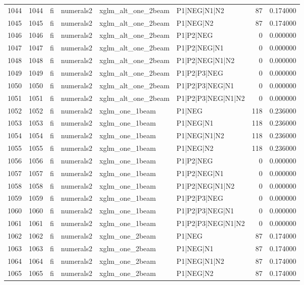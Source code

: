 \begin{tabular}{lrllllrr}
1044 & 1044 & fi & numerals2 & xglm_alt_one_2beam & P1|NEG|N1|N2 & 87 & 0.174000 \\
1045 & 1045 & fi & numerals2 & xglm_alt_one_2beam & P1|NEG|N2 & 87 & 0.174000 \\
1046 & 1046 & fi & numerals2 & xglm_alt_one_2beam & P1|P2|NEG & 0 & 0.000000 \\
1047 & 1047 & fi & numerals2 & xglm_alt_one_2beam & P1|P2|NEG|N1 & 0 & 0.000000 \\
1048 & 1048 & fi & numerals2 & xglm_alt_one_2beam & P1|P2|NEG|N1|N2 & 0 & 0.000000 \\
1049 & 1049 & fi & numerals2 & xglm_alt_one_2beam & P1|P2|P3|NEG & 0 & 0.000000 \\
1050 & 1050 & fi & numerals2 & xglm_alt_one_2beam & P1|P2|P3|NEG|N1 & 0 & 0.000000 \\
1051 & 1051 & fi & numerals2 & xglm_alt_one_2beam & P1|P2|P3|NEG|N1|N2 & 0 & 0.000000 \\
1052 & 1052 & fi & numerals2 & xglm_one_1beam & P1|NEG & 118 & 0.236000 \\
1053 & 1053 & fi & numerals2 & xglm_one_1beam & P1|NEG|N1 & 118 & 0.236000 \\
1054 & 1054 & fi & numerals2 & xglm_one_1beam & P1|NEG|N1|N2 & 118 & 0.236000 \\
1055 & 1055 & fi & numerals2 & xglm_one_1beam & P1|NEG|N2 & 118 & 0.236000 \\
1056 & 1056 & fi & numerals2 & xglm_one_1beam & P1|P2|NEG & 0 & 0.000000 \\
1057 & 1057 & fi & numerals2 & xglm_one_1beam & P1|P2|NEG|N1 & 0 & 0.000000 \\
1058 & 1058 & fi & numerals2 & xglm_one_1beam & P1|P2|NEG|N1|N2 & 0 & 0.000000 \\
1059 & 1059 & fi & numerals2 & xglm_one_1beam & P1|P2|P3|NEG & 0 & 0.000000 \\
1060 & 1060 & fi & numerals2 & xglm_one_1beam & P1|P2|P3|NEG|N1 & 0 & 0.000000 \\
1061 & 1061 & fi & numerals2 & xglm_one_1beam & P1|P2|P3|NEG|N1|N2 & 0 & 0.000000 \\
1062 & 1062 & fi & numerals2 & xglm_one_2beam & P1|NEG & 87 & 0.174000 \\
1063 & 1063 & fi & numerals2 & xglm_one_2beam & P1|NEG|N1 & 87 & 0.174000 \\
1064 & 1064 & fi & numerals2 & xglm_one_2beam & P1|NEG|N1|N2 & 87 & 0.174000 \\
1065 & 1065 & fi & numerals2 & xglm_one_2beam & P1|NEG|N2 & 87 & 0.174000 \\

\end{tabular}
